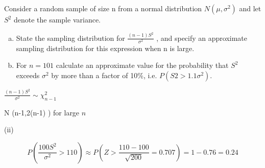 \documentclass[a4paper,12pt]{article}
\begin{document}
Consider a random sample of size n from a normal distribution $N( \mu, \sigma^2)$ and let $S^2$
denote the sample variance.
\begin{enumerate}[(a)]
    \item  State the sampling distribution for
${ \displaystyle \frac{(n-1)S^2}{\sigma^2} }$
, and specify an approximate
sampling distribution for this expression when n is large. 
    \item For $n = 101$ calculate an approximate value for the probability that $S^2$ exceeds
$\sigma^2$ by more than a factor of 10\%, i.e. $P(S2 > 1.1 \sigma^2)$. 

\end{enumerate}





\newpage
${ \displaystyle \frac{(n-1)S^2}{\sigma^2} } \sim \chi^2_{n-1}$

\approx N \left(n-1,2(n-1) \right) for large $n$


(ii)

\[P \left(  \frac{100 S^2}{\sigma^2} > 110 \right)
\approx P \left( Z > \frac{110-100}{\sqrt{200}} = 0.707 \right)  = 1-0.76=0.24 \]

\end{document}
